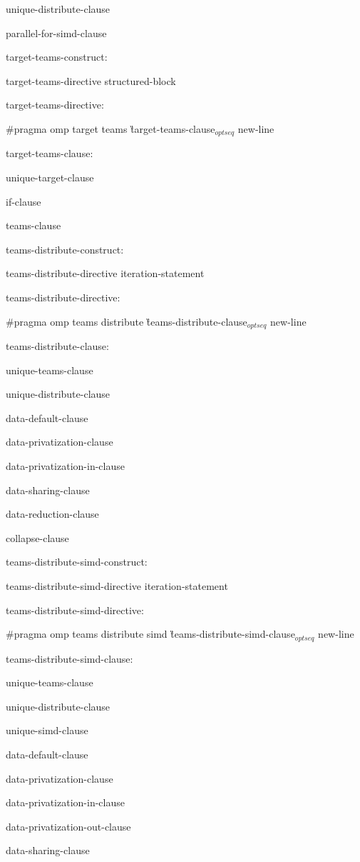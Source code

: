 {\I unique-distribute-clause

\I parallel-for-simd-clause

target-teams-construct:

\I target-teams-directive structured-block

target-teams-directive:

\C\I \#pragma omp target teams \G target-teams-clause$_{optseq}$ new-line

target-teams-clause:

\I unique-target-clause

\I if-clause

\I teams-clause

teams-distribute-construct:

\I teams-distribute-directive iteration-statement

teams-distribute-directive:

\C\I \#pragma omp teams distribute \G teams-distribute-clause$_{optseq}$ new-line

teams-distribute-clause:

\I unique-teams-clause

\I unique-distribute-clause

\I data-default-clause

\I data-privatization-clause

\I data-privatization-in-clause

\I data-sharing-clause

\I data-reduction-clause

\I collapse-clause

teams-distribute-simd-construct:

\I teams-distribute-simd-directive iteration-statement

teams-distribute-simd-directive:

\C\I \#pragma omp teams distribute simd \G teams-distribute-simd-clause$_{optseq}$ new-line

teams-distribute-simd-clause:

\I unique-teams-clause

\I unique-distribute-clause

\I unique-simd-clause

\I data-default-clause

\I data-privatization-clause

\I data-privatization-in-clause

\I data-privatization-out-clause

\I data-sharing-clause

}
